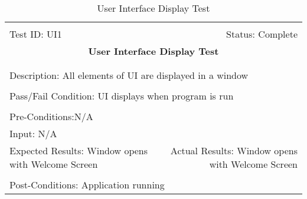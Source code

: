 \documentclass[11pt]{article}
\begin{document}
\begin{center}
\begin{table}[H]
\begin{tabular}{|l r|}\hline&\\[-2mm]
	Test ID: UI1	&Status: Complete \\[-3mm]
	\multicolumn{2}{|c|}{\textbf{\large{User Interface Display Test}}}\\&\\\hline&\\[-3mm]
	\multicolumn{2}{|p{\textwidth}|}{Description: All elements of UI are displayed in a window}\\[1mm]\hline&\\[-3mm]
	\multicolumn{2}{|p{\textwidth}|}{Pass/Fail Condition: UI displays when program is run}\\[1mm]\hline&\\[-3mm]
	\multicolumn{2}{|p{\textwidth}|}{Pre-Conditions:N/A}\\[4mm]
	\multicolumn{2}{|p{\textwidth}|}{Input: N/A}\\[2mm]\hline
	\multicolumn{1}{|p{0.49\textwidth}}{Expected Results: Window opens with Welcome Screen}	&\multicolumn{1}{|p{0.45\textwidth}|}{Actual Results: Window opens with Welcome Screen}\\\hline&\\[-3mm]
	\multicolumn{2}{|p{\textwidth}|}{Post-Conditions: Application running}\\\hline
\end{tabular}
\caption{User Interface Display Test}
\end{table}
\end{center}
\end{document}
